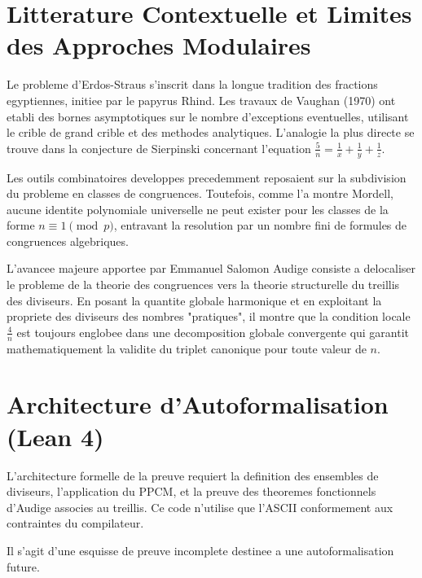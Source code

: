 \documentclass[11pt,a4paper]{article}
\begin{document}
\section{Litterature Contextuelle et Limites des Approches Modulaires}

Le probleme d'Erdos-Straus s'inscrit dans la longue tradition des fractions egyptiennes, initiee par le papyrus Rhind. Les travaux de Vaughan (1970) ont etabli des bornes asymptotiques sur le nombre d'exceptions eventuelles, utilisant le crible de grand crible et des methodes analytiques. L'analogie la plus directe se trouve dans la conjecture de Sierpinski concernant l'equation $\frac{5}{n} = \frac{1}{x} + \frac{1}{y} + \frac{1}{z}$.

Les outils combinatoires developpes precedemment reposaient sur la subdivision du probleme en classes de congruences. Toutefois, comme l'a montre Mordell, aucune identite polynomiale universelle ne peut exister pour les classes de la forme $n \equiv 1 \pmod{p}$, entravant la resolution par un nombre fini de formules de congruences algebriques.

L'avancee majeure apportee par Emmanuel Salomon Audige consiste a delocaliser le probleme de la theorie des congruences vers la theorie structurelle du treillis des diviseurs. En posant la quantite globale harmonique et en exploitant la propriete des diviseurs des nombres "pratiques", il montre que la condition locale $\frac{4}{n}$ est toujours englobee dans une decomposition globale convergente qui garantit mathematiquement la validite du triplet canonique pour toute valeur de $n$.

\section{Architecture d'Autoformalisation (Lean 4)}

L'architecture formelle de la preuve requiert la definition des ensembles de diviseurs, l'application du PPCM, et la preuve des theoremes fonctionnels d'Audige associes au treillis. Ce code n'utilise que l'ASCII conformement aux contraintes du compilateur.

Il s'agit d'une esquisse de preuve incomplete destinee a une autoformalisation future.
\end{document}
